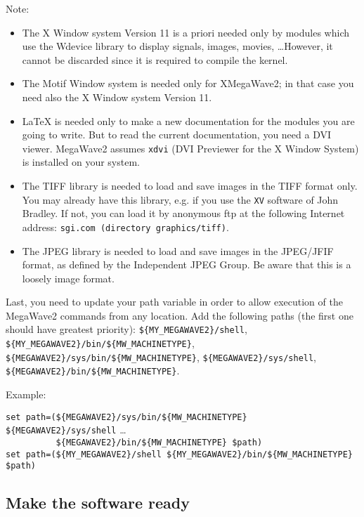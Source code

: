 Note:
\begin{itemize}
\item The X Window system Version 11 is a priori needed only by modules which use the Wdevice library to display signals, images, movies, \ldots However, it cannot be discarded since it is required to compile the kernel.
\item The Motif Window system is needed only for XMegaWave2; 
in that case you need also the X Window system Version 11.
\item \LaTeX{} is needed only to make a new documentation for the modules you are going to write.
But to read the current documentation, you need a DVI viewer. MegaWave2 assumes \verb+xdvi+
 (DVI Previewer for the X Window System) is installed on your system.
\item The TIFF library is needed to load and save images in the TIFF format only.
You may already have this library, e.g. if you use the \verb+XV+ software of John Bradley.
If not, you can load it by anonymous ftp at the following Internet address:
\verb+sgi.com (directory graphics/tiff)+.
\item The JPEG library is needed to load and save images in the JPEG/JFIF format, as defined by the 
Independent JPEG Group. Be aware that this is a loosely image format.
\end{itemize}

Last, you need to update your path variable in order to allow execution of the MegaWave2 commands from any location. 
Add the following paths (the first one should have greatest priority): 
\verb+${MY_MEGAWAVE2}/shell+, \verb+${MY_MEGAWAVE2}/bin/${MW_MACHINETYPE}+, \\
\verb+${MEGAWAVE2}/sys/bin/${MW_MACHINETYPE}+, \verb+${MEGAWAVE2}/sys/shell+,\\ \verb+${MEGAWAVE2}/bin/${MW_MACHINETYPE}+.

Example: 
\begin{tabbing}
\verb+set path=(${MEGAWAVE2}/sys/bin/${MW_MACHINETYPE} ${MEGAWAVE2}/sys/shell+ \ldots \\
\verb+          ${MEGAWAVE2}/bin/${MW_MACHINETYPE} $path)+ \\
\verb+set path=(${MY_MEGAWAVE2}/shell ${MY_MEGAWAVE2}/bin/${MW_MACHINETYPE} $path)+
\end{tabbing}


\subsection{Make the software ready}
\label{install_system_make-ready}

